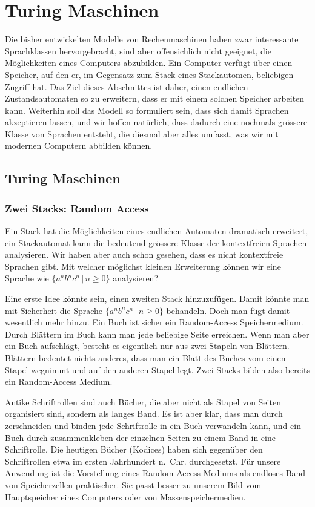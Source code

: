 %
%
%
\chapter{Turing Maschinen\label{chapter-turing}}
Die bisher entwickelten Modelle von Rechenmaschinen haben zwar
interessante Sprachklassen hervorgebracht, sind aber offensichlich nicht
geeignet, die Möglichkeiten eines Computers abzubilden. Ein
Computer verfügt über einen Speicher, auf den er, im Gegensatz zum
Stack eines Stackautomen, beliebigen Zugriff hat. Das Ziel dieses
Abschnittes ist daher, einen endlichen Zustandsautomaten so zu
erweitern, dass er mit einem solchen Speicher arbeiten kann.
Weiterhin soll das Modell so formuliert sein, dass sich damit
Sprachen akzeptieren lassen, und wir hoffen natürlich, dass dadurch
eine nochmals grössere Klasse von Sprachen entsteht, die diesmal
aber alles umfasst, was wir mit modernen Computern abbilden können.

\section{Turing Maschinen}
\subsection{Zwei Stacks: Random Access}
Ein Stack hat die Möglichkeiten eines endlichen Automaten dramatisch
erweitert, ein Stackautomat kann die bedeutend grössere Klasse der
kontextfreien Sprachen analysieren. Wir haben aber auch schon gesehen,
dass es nicht kontextfreie Sprachen gibt. Mit welcher möglichst kleinen
Erweiterung können wir eine Sprache wie $\{a^nb^nc^n\,|\, n\ge 0\}$
analysieren?

Eine erste Idee könnte sein, einen zweiten Stack hinzuzufügen.
Damit könnte man mit Sicherheit die Sprache $\{a^nb^nc^n\,|\,n\ge 0\}$
behandeln. Doch man fügt damit wesentlich mehr hinzu. Ein Buch ist
sicher ein Random-Access Speichermedium. Durch Blättern im Buch
kann man jede beliebige Seite erreichen. Wenn man aber ein Buch
aufschlägt, besteht es eigentlich nur aus zwei Stapeln von Blättern.
Blättern bedeutet nichts anderes, dass man ein Blatt des Buches vom
einen Stapel wegnimmt und auf den anderen Stapel legt. Zwei Stacks
bilden also bereits ein Random-Access Medium.

Antike Schriftrollen sind auch Bücher, die aber nicht als Stapel
von Seiten organisiert sind, sondern als langes Band. Es ist aber klar,
dass man durch zerschneiden und binden jede Schriftrolle in ein
Buch verwandeln kann, und ein Buch durch zusammenkleben der einzelnen
Seiten zu einem Band in eine Schriftrolle.
Die heutigen Bücher (Kodices) haben sich gegenüber den Schriftrollen
etwa im ersten Jahrhundert n.~Chr. durchgesetzt.
Für unsere Anwendung ist die Vorstellung eines Random-Access Mediums
als endloses Band von Speicherzellen praktischer. Sie passt besser zu
unserem Bild vom Hauptspeicher eines Computers oder von Massenspeichermedien.
